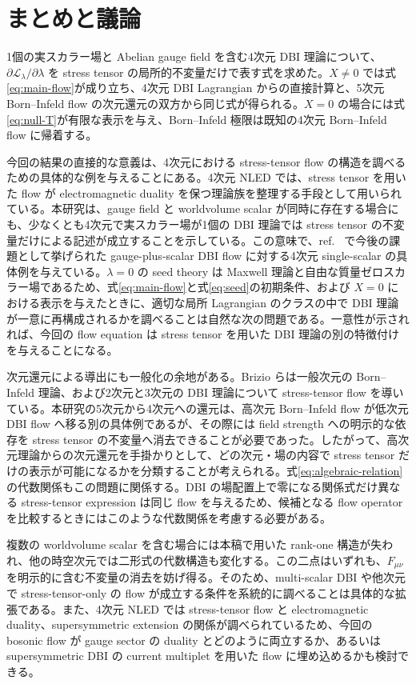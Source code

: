 \documentclass[a4paper,11pt]{ltjsarticle}
\numberwithin{equation}{section}
\newcommand{\Lag}{\mathcal L}
\begin{document}
\section{まとめと議論}
\label{sec:discussion}

1個の実スカラー場と Abelian gauge field を含む4次元 DBI 理論について、$\partial\Lag_\lambda/\partial\lambda$ を stress tensor の局所的不変量だけで表す式を求めた。$X\neq0$ では式\eqref{eq:main-flow}が成り立ち、4次元 DBI Lagrangian からの直接計算と、5次元 Born--Infeld flow の次元還元の双方から同じ式が得られる。$X=0$ の場合には式\eqref{eq:null-T}が有限な表示を与え、Born--Infeld 極限は既知の4次元 Born--Infeld flow に帰着する。

今回の結果の直接的な意義は、4次元における stress-tensor flow の構造を調べるための具体的な例を与えることにある。4次元 NLED では、stress tensor を用いた flow が electromagnetic duality を保つ理論族を整理する手段として用いられている\cite{Ferko2023Duality,Ferko2023Birefringence}。本研究は、gauge field と worldvolume scalar が同時に存在する場合にも、少なくとも4次元で実スカラー場が1個の DBI 理論では stress tensor の不変量だけによる記述が成立することを示している。この意味で、ref.~\cite{Ferko2024DBI} で今後の課題として挙げられた gauge-plus-scalar DBI flow に対する4次元 single-scalar の具体例を与えている。$\lambda=0$ の seed theory は Maxwell 理論と自由な質量ゼロスカラー場であるため、式\eqref{eq:main-flow}と式\eqref{eq:seed}の初期条件、および $X=0$ における表示を与えたときに、適切な局所 Lagrangian のクラスの中で DBI 理論が一意に再構成されるかを調べることは自然な次の問題である。一意性が示されれば、今回の flow equation は stress tensor を用いた DBI 理論の別の特徴付けを与えることになる。

次元還元による導出にも一般化の余地がある。Brizio らは一般次元の Born--Infeld 理論、および2次元と3次元の DBI 理論について stress-tensor flow を導いている\cite{Brizio2026}。本研究の5次元から4次元への還元は、高次元 Born--Infeld flow が低次元 DBI flow へ移る別の具体例であるが、その際には field strength への明示的な依存を stress tensor の不変量へ消去できることが必要であった。したがって、高次元理論からの次元還元を手掛かりとして、どの次元・場の内容で stress tensor だけの表示が可能になるかを分類することが考えられる。式\eqref{eq:algebraic-relation}の代数関係もこの問題に関係する。DBI の場配置上で零になる関係式だけ異なる stress-tensor expression は同じ flow を与えるため、候補となる flow operator を比較するときにはこのような代数関係を考慮する必要がある。

複数の worldvolume scalar を含む場合には本稿で用いた rank-one 構造が失われ、他の時空次元では二形式の代数構造も変化する。この二点はいずれも、$F_{\mu\nu}$ を明示的に含む不変量の消去を妨げ得る。そのため、multi-scalar DBI や他次元で stress-tensor-only の flow が成立する条件を系統的に調べることは具体的な拡張である。また、4次元 NLED では stress-tensor flow と electromagnetic duality、supersymmetric extension の関係が調べられているため\cite{Ferko2023Birefringence,Ferko2023Duality}、今回の bosonic flow が gauge sector の duality とどのように両立するか、あるいは supersymmetric DBI の current multiplet を用いた flow に埋め込めるかも検討できる。
\end{document}
